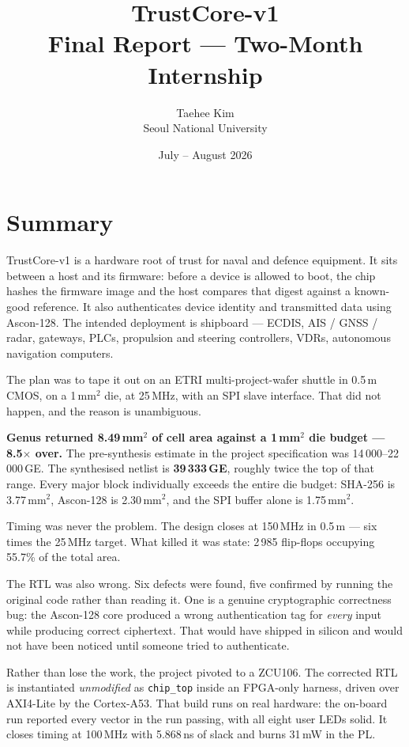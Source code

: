 \documentclass[11pt,a4paper]{article}
\title{\vspace{-1.7cm}\textbf{TrustCore-v1}\\[0.3em]
\large Final Report --- Two-Month Internship}
\author{Taehee Kim\\[-0.2em]\small Seoul National University}
\date{July -- August 2026}
\newcommand{\keyfinding}[1]{%
  \par\vspace{0.55em}
  \noindent\hspace{0.035\textwidth}\parbox{0.93\textwidth}{#1}
  \par\vspace{0.55em}}
\begin{document}
\maketitle
\vspace{-0.9cm}

\section{Summary}

TrustCore-v1 is a hardware root of trust for naval and defence equipment. It
sits between a host and its firmware: before a device is allowed to boot, the
chip hashes the firmware image and the host compares that digest against a
known-good reference. It also authenticates device identity and transmitted
data using Ascon-128. The intended deployment is shipboard --- ECDIS, AIS /
GNSS / radar, gateways, PLCs, propulsion and steering controllers, VDRs,
autonomous navigation computers.

The plan was to tape it out on an ETRI multi-project-wafer shuttle in
0.5\,\textmu m CMOS, on a 1\,mm$^2$ die, at 25\,MHz, with an SPI slave
interface. That did not happen, and the reason is unambiguous.

\keyfinding{\textbf{Genus returned 8.49\,mm$^2$ of cell area against a
1\,mm$^2$ die budget --- 8.5$\times$ over.} The pre-synthesis estimate in the
project specification was 14\,000--22\,000\,GE. The synthesised netlist is
\textbf{39\,333\,GE}, roughly twice the top of that range.
Every major block individually exceeds the entire die budget: SHA-256 is
3.77\,mm$^2$, Ascon-128 is 2.30\,mm$^2$, and the SPI buffer alone is
1.75\,mm$^2$.}

Timing was never the problem. The design closes at 150\,MHz in
0.5\,\textmu m --- six times the 25\,MHz target. What killed it was state:
2\,985 flip-flops occupying 55.7\% of the total area.

The RTL was also wrong. Six defects were found, five confirmed by running the
original code rather than reading it. One is a genuine cryptographic
correctness bug: the Ascon-128 core produced a wrong authentication tag for
\emph{every} input while producing correct ciphertext. That would have shipped
in silicon and would not have been noticed until someone tried to
authenticate.

Rather than lose the work, the project pivoted to a ZCU106. The corrected RTL
is instantiated \emph{unmodified} as \texttt{chip\_top} inside an FPGA-only
harness, driven over AXI4-Lite by the Cortex-A53. That build runs on real
hardware: the on-board run reported every vector in the run passing, with all
eight user LEDs solid. It closes timing at 100\,MHz with 5.868\,ns of slack and
burns 31\,mW in the PL.
\end{document}

